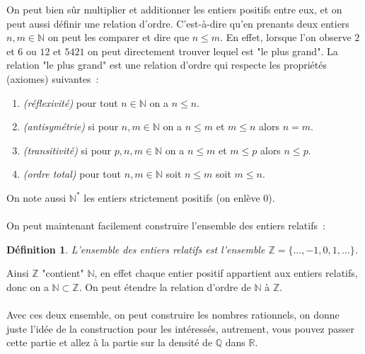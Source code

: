 \documentclass[a4paper, 12pt, french, twoside]{article}
\newtheorem{defi}[theorem]{Définition}
\newcommand{\Nn}{{\mathbb{N}}}
\newcommand{\Zz}{{\mathbb{Z}}}
\newcommand{\Rr}{{\mathbb{R}}}
\newcommand{\Qq}{{\mathbb{Q}}}
\begin{document}
On peut bien sûr multiplier et additionner les entiers positifs entre eux, et on peut aussi définir une relation d'ordre. C'est-à-dire qu'en prenants deux entiers $n,m\in \Nn$ on peut les comparer et dire que $n\leq m $. En effet, lorsque l'on observe $2$ et $6$ ou $12$ et $5421$ on peut directement trouver lequel est "le plus grand". La relation "le plus grand" est une relation d'ordre qui respecte les propriétés (axiomes) suivantes : 
\begin{enumerate} [label=\arabic*)]
    \item \textit{(réflexivité)} pour tout $ n\in \Nn$ on a $n\leq n$.
    \item \textit{(antisymétrie)} si pour $n,m\in \Nn$ on a $n\leq m$ et $m\leq n$ alors $n=m$.
    \item \textit{(transitivité)} si pour $p,n,m \in \Nn$ on a $n\leq m$ et $m\leq p$ alors $n\leq p$.
    \item \textit{(ordre total)} pour tout $n,m\in \Nn$ soit $n\leq m$ soit $m\leq n$.
\end{enumerate}
On note aussi $\Nn^*$ les entiers strictement positifs (on enlève 0).\\\\
On peut maintenant facilement construire l'ensemble des entiers relatifs : 
\begin{defi}
    L'ensemble des entiers relatifs est l'ensemble $\Zz=\{...,-1,0,1,...\}$.
\end{defi}
Ainsi $\Zz$ "contient" $\Nn$, en effet chaque entier positif appartient aux entiers relatifs, donc on a $\Nn \subset \Zz$. On peut étendre la relation d'ordre de $\Nn$ à $\Zz$.\\\\
Avec ces deux ensemble, on peut construire les nombres rationnels, on donne juste l'idée de la construction pour les intéressés, autrement, vous pouvez passer cette partie et allez à la partie sur la densité de $\Qq$ dans $\Rr$.
\end{document}
